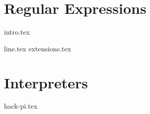 \documentclass{exam}
\begin{document}
\section{Regular Expressions}
{intro.tex}
\begin{questions}
{line.tex}
{extensions.tex}
\end{questions}

\section{Interpreters}
\begin{questions}
{hack-pi.tex}
\end{questions}

\end{document}
